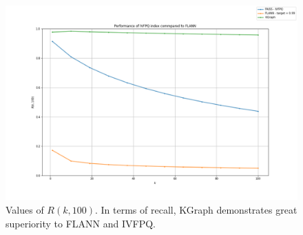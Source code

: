 \begin{frame}

\begin{figure}
\centering
\includegraphics[width=0.9\linewidth]{../images/kgraph/comparison}
\caption{Values of $R(k, 100)$. In terms of recall, KGraph demonstrates great superiority to FLANN and IVFPQ.}
\label{fig:comparison}
\end{figure}

\end{frame}